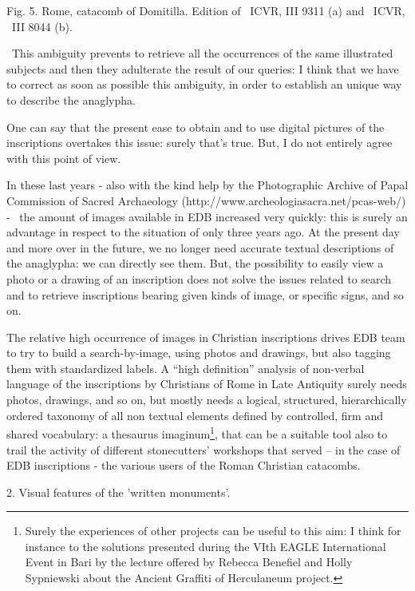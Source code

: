 \documentclass[amsthm,ebook]{saparticle}
\begin{document}
Fig. 5. Rome, catacomb of Domitilla. Edition of \ ICVR, III 9311 (a) and \ ICVR, \ III 8044 (b). \ \ \ \ \ \ 


\bigskip

\ This ambiguity prevents to retrieve all the occurrences of the same illustrated subjects and then they adulterate the
result of our queries: I think that we have to correct as soon as possible this ambiguity, in order to establish an
unique way to describe the anaglypha. 

One can say that the present ease to obtain and to use digital pictures of the inscriptions overtakes this issue: surely
that's true. But, I do not entirely agree with this point of view. 

In these last years - also with the kind help by the Photographic Archive of Papal Commission of Sacred Archaeology
(http://www.archeologiasacra.net/pcas-web/) - \ the amount of images available in EDB increased very quickly: this is
surely an advantage in respect to the situation of only three years ago. At the present day and more over in the
future, we no longer need accurate textual descriptions of the anaglypha: we can directly see them. But, the
possibility to easily view a photo or a drawing of an inscription does not solve the issues related to search and to
retrieve inscriptions bearing given kinds of image, or specific signs, and so on. \ 

The relative high occurrence of images in Christian inscriptions drives EDB team to try to build a search-by-image,
using photos and drawings, but also tagging them with standardized labels. A “high definition” analysis of non-verbal
language of the inscriptions by Christians of Rome in Late Antiquity surely needs photos, drawings, and so on, but
mostly needs a logical, structured, hierarchically ordered taxonomy of all non textual elements defined by controlled,
firm and shared vocabulary: a thesaurus imaginum\footnote{ Surely the experiences of other projects can be useful to
this aim: I think for instance to the solutions presented during the VIth EAGLE International Event in Bari by the
lecture offered by Rebecca Benefiel and Holly Sypniewski about the Ancient Graffiti of Herculaneum project.}, that can
be a suitable tool also to trail the activity of different stonecutters’ workshops that served – in the case of EDB
inscriptions - the various users of the Roman Christian catacombs. 


\bigskip

2. Visual features of the 'written monuments'. \ 
\end{document}
